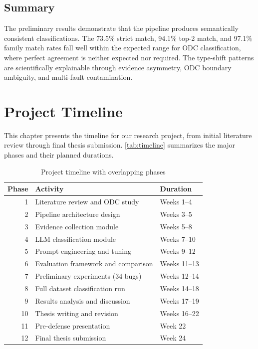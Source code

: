 \documentclass{iutbscthesis}
\begin{document}
\section{Summary}

The preliminary results demonstrate that the pipeline produces semantically consistent classifications. The 73.5\% strict match, 94.1\% top-2 match, and 97.1\% family match rates fall well within the expected range for ODC classification, where perfect agreement is neither expected nor required. The type-shift patterns are scientifically explainable through evidence asymmetry, ODC boundary ambiguity, and multi-fault contamination.


\chapter{Project Timeline}

This chapter presents the timeline for our research project, from initial literature review through final thesis submission. \autoref{tab:timeline} summarizes the major phases and their planned durations.

\begin{table}[H]
    \centering
    \begin{tabular}{r l l}
        \toprule
        \textbf{Phase} & \textbf{Activity} & \textbf{Duration} \\
        \midrule
        1 & Literature review and ODC study & Weeks 1--4 \\
        2 & Pipeline architecture design & Weeks 3--5 \\
        3 & Evidence collection module & Weeks 5--8 \\
        4 & LLM classification module & Weeks 7--10 \\
        5 & Prompt engineering and tuning & Weeks 9--12 \\
        6 & Evaluation framework and comparison & Weeks 11--13 \\
        7 & Preliminary experiments (34 bugs) & Weeks 12--14 \\
        8 & Full dataset classification run & Weeks 14--18 \\
        9 & Results analysis and discussion & Weeks 17--19 \\
        10 & Thesis writing and revision & Weeks 16--22 \\
        11 & Pre-defense presentation & Week 22 \\
        12 & Final thesis submission & Week 24 \\
        \bottomrule
    \end{tabular}
    \caption{Project timeline with overlapping phases}
    \label{tab:timeline}
\end{table}
\end{document}
